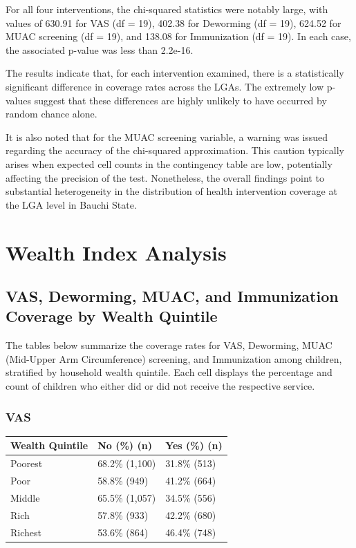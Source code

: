 \documentclass[
  11pt,
]{report}
\begin{document}
For all four interventions, the chi-squared statistics were notably
large, with values of 630.91 for VAS (df = 19), 402.38 for Deworming (df
= 19), 624.52 for MUAC screening (df = 19), and 138.08 for Immunization
(df = 19). In each case, the associated p-value was less than 2.2e-16.

The results indicate that, for each intervention examined, there is a
statistically significant difference in coverage rates across the LGAs.
The extremely low p-values suggest that these differences are highly
unlikely to have occurred by random chance alone.

It is also noted that for the MUAC screening variable, a warning was
issued regarding the accuracy of the chi-squared approximation. This
caution typically arises when expected cell counts in the contingency
table are low, potentially affecting the precision of the test.
Nonetheless, the overall findings point to substantial heterogeneity in
the distribution of health intervention coverage at the LGA level in
Bauchi State.

\section{Wealth Index Analysis}\label{wealth-index-analysis}

\subsection{VAS, Deworming, MUAC, and Immunization Coverage by Wealth
Quintile}\label{vas-deworming-muac-and-immunization-coverage-by-wealth-quintile}

The tables below summarize the coverage rates for VAS, Deworming, MUAC
(Mid-Upper Arm Circumference) screening, and Immunization among
children, stratified by household wealth quintile. Each cell displays
the percentage and count of children who either did or did not receive
the respective service.

\subsubsection{VAS}\label{vas}

\begin{longtable}[]{@{}lll@{}}
\toprule\noalign{}
Wealth Quintile & No (\%) (n) & Yes (\%) (n) \\
\midrule\noalign{}
\endhead
\bottomrule\noalign{}
\endlastfoot
Poorest & 68.2\% (1,100) & 31.8\% (513) \\
Poor & 58.8\% (949) & 41.2\% (664) \\
Middle & 65.5\% (1,057) & 34.5\% (556) \\
Rich & 57.8\% (933) & 42.2\% (680) \\
Richest & 53.6\% (864) & 46.4\% (748) \\
\end{longtable}
\end{document}
